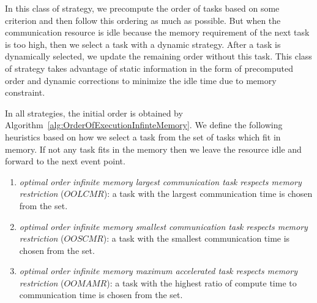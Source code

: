 \documentclass[sigconf]{acmart}
\begin{document}
	In this class of strategy, we precompute the order of tasks based on some criterion and then follow this ordering as much as possible. But when the communication resource is idle because the memory requirement of the next task is too high, then we select a task  with a dynamic strategy. After a task is dynamically selected, we update the remaining order without this task. This class of strategy takes advantage of static information in the form of precomputed order and dynamic corrections to minimize the idle time due to memory constraint.
	
	In all strategies, the initial order is obtained by Algorithm~\ref{alg:OrderOfExecutionInfinteMemory}. We define the following heuristics based on how we select a task from the set of tasks which fit in memory. If not any task fits in the memory then we leave the resource idle and forward to the next event point.
	
	\begin{enumerate}[label=\roman*)]
		\item \textit{optimal order infinite memory largest communication task respects memory restriction} ($OOLCMR$): a task with the largest communication time is chosen from the set.
		\item \textit{optimal order infinite memory smallest communication task respects memory restriction} ($OOSCMR$): a task with the smallest communication time is chosen from the set.
		\item \textit{optimal order infinite memory maximum accelerated task respects memory restriction} ($OOMAMR$): a task  with the highest ratio of compute time to communication time is chosen from the set.
	\end{enumerate}
	
\end{document}
